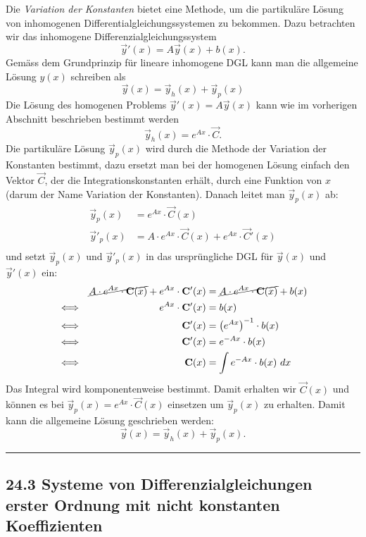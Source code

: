 \documentclass[a4paper,landscape,8pt]{extarticle}
\newcommand{\sep}{\vspace{5pt}\noindent\hrule\vspace{5pt}}
\begin{document}
\begin{multicols*}{4}
Die \emph{Variation der Konstanten} bietet eine Methode, um die partikuläre
Lösung von inhomogenen Differentialgleichungssystemen zu bekommen. Dazu
betrachten wir das inhomogene Differenzialgleichungssystem
\[
\vec{y}'(x) = A\vec{y}(x) + b(x).
\]
Gemäss dem Grundprinzip für lineare inhomogene DGL kann man die allgemeine
Lösung $y(x)$ schreiben als
\[
\vec{y}(x) = \vec{y}_h(x) + \vec{y}_p(x)
\]
Die Lösung des homogenen Problems $\vec{y}'(x) = A\vec{y}(x)$ kann wie im
vorherigen Abschnitt beschrieben bestimmt werden
\[
\vec{y}_h(x) = e^{Ax}\cdot \vec{C}.
\]
Die partikuläre Lösung $\vec{y}_p(x)$ wird durch die Methode der Variation der
Konstanten bestimmt, dazu ersetzt man bei der homogenen Lösung einfach den
Vektor $\vec{C}$, der die Integrationskonstanten erhält, durch eine Funktion von
$x$ (darum der Name Variation der Konstanten). Danach leitet man $\vec{y}_p(x)$
ab:
\begin{align*}
\vec{y}_p(x) &= e^{Ax}\cdot \vec{C}(x)\\
\vec{y}'_p(x) &= A\cdot e^{Ax}\cdot \vec{C}(x) + e^{Ax}\cdot \vec{C}'(x)\\
\end{align*}
und setzt $\vec{y}_p(x)$ und $\vec{y}'_p(x)$ in das ursprüngliche DGL für
$\vec{y}(x)$ und $\vec{y}'(x)$ ein:
\begin{align*}
& &\cancel{A\cdot e^{Ax}\cdot \vec{C}(x)} + e^{Ax}\cdot \vec{C}'(x) &=
\cancel{A\cdot e^{Ax}\cdot \vec{C}(x)} + b(x)\\
& \Longleftrightarrow &e^{Ax}\cdot \vec{C}'(x) &= b(x)\\
& \Longleftrightarrow & \vec{C}'(x) &= \left(e^{Ax}\right)^{-1}\cdot b(x)\\
& \Longleftrightarrow & \vec{C}'(x) &= e^{-Ax}\cdot b(x)\\
& \Longleftrightarrow & \vec{C}(x) &= \int e^{-Ax}\cdot b(x) \ dx\\
\end{align*}
Das Integral wird komponentenweise bestimmt. Damit erhalten wir $\vec{C}(x)$ und
können es bei $\vec{y}_p(x)=e^{Ax}\cdot \vec{C}(x)$ einsetzen um $\vec{y}_p(x)$
zu erhalten. Damit kann die allgemeine Lösung geschrieben werden:
\[
\vec{y}(x) = \vec{y}_h(x) + \vec{y}_p(x).
\]

\sep

\subsection{24.3 Systeme von Differenzialgleichungen erster Ordnung mit nicht
konstanten Koeffizienten}


\end{multicols*}
\end{document}
